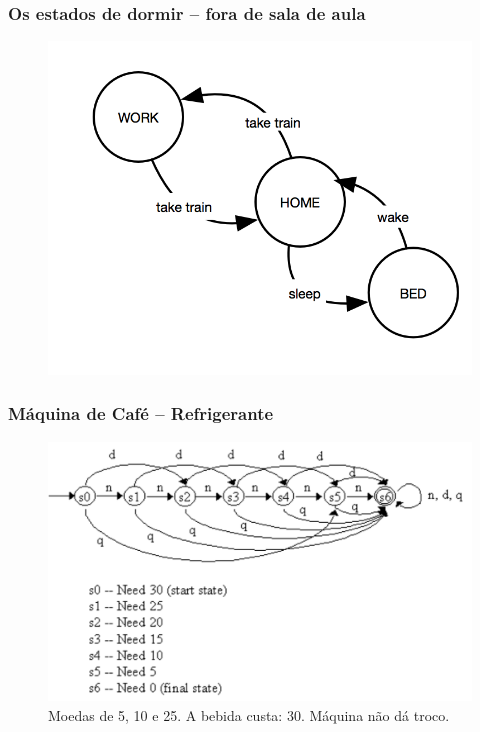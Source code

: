 \documentclass[10pt]{beamer}
\begin{document}
\begin{frame}[fragile]

\frametitle{Os estados de dormir -- fora de sala de aula}

\begin{figure}[!ht]
\centering
\includegraphics[height =.65\textheight,width=.8\textwidth]
{figuras/estados_trem_dormir.png}
\end{figure}

\end{frame}



\begin{frame}[fragile]

\frametitle{Máquina de Café -- Refrigerante}
\begin{figure}[!ht]
\centering
\includegraphics[height =.65\textheight,width=.8\textwidth]
{figuras/maquina_refrigerante.pdf}
\caption{Moedas de 5, 10 e 25. A bebida custa: 30. Máquina não dá troco.}
\end{figure}

\end{frame}
\end{document}
